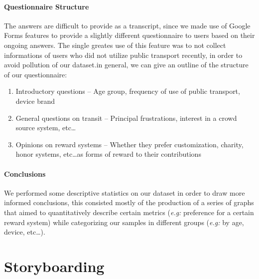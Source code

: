 \documentclass[a4paper, 11pt]{report}
\begin{document}
\paragraph{Questionnaire Structure}


The answers are difficult to provide as a transcript, since we made use of Google Forms
features to provide a slightly different questionnaire to users based on their ongoing answers.
The single greates use of this feature was to not collect informations of users who did not
utilize public transport recently, in order to avoid pollution of our dataset.\@ in
general, we can give an outline of the structure of our questionnaire:

\begin{enumerate}
	\item Introductory questions -- Age group, frequency of use of public transport, device brand
	\item General questions on transit -- Principal frustrations, interest in a crowd source system, etc\dots
	\item Opinions on reward systems -- Whether they prefer customization, charity, honor systems, etc\dots\@ as
	      forms of reward to their contributions
\end{enumerate}

\paragraph{Conclusions}
We performed some descriptive statistics on our dataset in order to draw more informed conclusions,
this consisted mostly of the production of a series of graphs that aimed to quantitatively
describe certain metrics (\emph{e.g:} preference for a certain reward system) while categorizing
our samples in different groups (\emph{e.g:} by age, device, etc\dots).



%
%

\section{Storyboarding}\label{sec:storyboarding}
\end{document}
